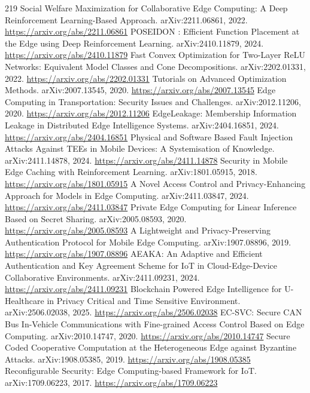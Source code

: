 \documentclass[11pt]{article}
\begin{document}
\begin{thebibliography}{219}
 Social Welfare Maximization for Collaborative Edge Computing: A Deep Reinforcement Learning-Based Approach. arXiv:2211.06861, 2022. \url{https://arxiv.org/abs/2211.06861}
 POSEIDON : Efficient Function Placement at the Edge using Deep Reinforcement Learning. arXiv:2410.11879, 2024. \url{https://arxiv.org/abs/2410.11879}
 Fast Convex Optimization for Two-Layer ReLU Networks: Equivalent Model Classes and Cone Decompositions. arXiv:2202.01331, 2022. \url{https://arxiv.org/abs/2202.01331}
 Tutorials on Advanced Optimization Methods. arXiv:2007.13545, 2020. \url{https://arxiv.org/abs/2007.13545}
 Edge Computing in Transportation: Security Issues and Challenges. arXiv:2012.11206, 2020. \url{https://arxiv.org/abs/2012.11206}
 EdgeLeakage: Membership Information Leakage in Distributed Edge Intelligence Systems. arXiv:2404.16851, 2024. \url{https://arxiv.org/abs/2404.16851}
 Physical and Software Based Fault Injection Attacks Against TEEs in Mobile Devices: A Systemisation of Knowledge. arXiv:2411.14878, 2024. \url{https://arxiv.org/abs/2411.14878}
 Security in Mobile Edge Caching with Reinforcement Learning. arXiv:1801.05915, 2018. \url{https://arxiv.org/abs/1801.05915}
 A Novel Access Control and Privacy-Enhancing Approach for Models in Edge Computing. arXiv:2411.03847, 2024. \url{https://arxiv.org/abs/2411.03847}
 Private Edge Computing for Linear Inference Based on Secret Sharing. arXiv:2005.08593, 2020. \url{https://arxiv.org/abs/2005.08593}
 A Lightweight and Privacy-Preserving Authentication Protocol for Mobile Edge Computing. arXiv:1907.08896, 2019. \url{https://arxiv.org/abs/1907.08896}
 AEAKA: An Adaptive and Efficient Authentication and Key Agreement Scheme for IoT in Cloud-Edge-Device Collaborative Environments. arXiv:2411.09231, 2024. \url{https://arxiv.org/abs/2411.09231}
 Blockchain Powered Edge Intelligence for U-Healthcare in Privacy Critical and Time Sensitive Environment. arXiv:2506.02038, 2025. \url{https://arxiv.org/abs/2506.02038}
 EC-SVC: Secure CAN Bus In-Vehicle Communications with Fine-grained Access Control Based on Edge Computing. arXiv:2010.14747, 2020. \url{https://arxiv.org/abs/2010.14747}
 Secure Coded Cooperative Computation at the Heterogeneous Edge against Byzantine Attacks. arXiv:1908.05385, 2019. \url{https://arxiv.org/abs/1908.05385}
 Reconfigurable Security: Edge Computing-based Framework for IoT. arXiv:1709.06223, 2017. \url{https://arxiv.org/abs/1709.06223}

\end{thebibliography}
\end{document}
